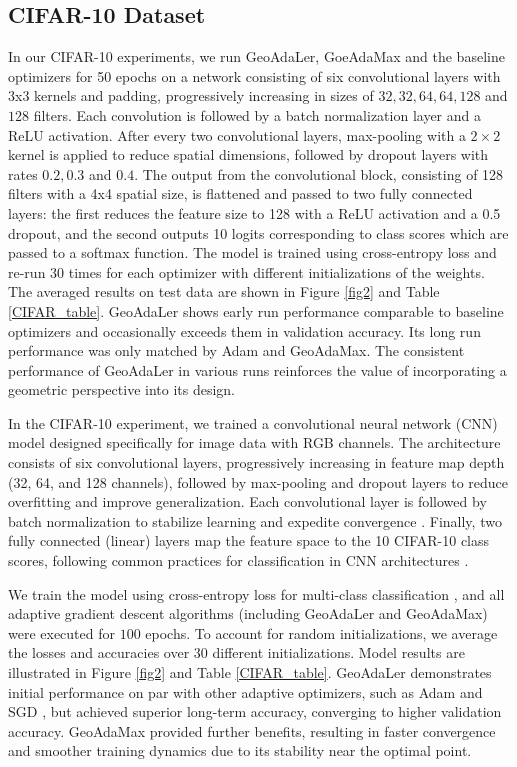 \documentclass{article}
\begin{document}
\subsection{CIFAR-10 Dataset}

In our CIFAR-10 \citep{Krizhevsky2012} experiments, we run GeoAdaLer, GoeAdaMax and the baseline optimizers for 50 epochs on a network consisting of six convolutional layers with 3x3 kernels and padding, progressively increasing in sizes of $32,32,64,64,128$ and $128$ filters. Each convolution is followed by a batch normalization layer and a ReLU activation. After every two convolutional layers, max-pooling with a $2\times2$ kernel is applied to reduce spatial dimensions, followed by dropout layers with rates $0.2,0.3$ and $0.4$. The output from the convolutional block, consisting of 128 filters with a 4x4 spatial size, is flattened and passed to two fully connected layers: the first reduces the feature size to 128 with a ReLU activation and a 0.5 dropout, and the second outputs 10 logits corresponding to class scores which are passed to a softmax function. The model is trained using cross-entropy loss and re-run 30 times for each optimizer with different initializations of the weights. The averaged results on test data are shown in Figure \ref{fig2} and Table \ref{CIFAR_table}. 
GeoAdaLer shows early run performance comparable to baseline optimizers and occasionally exceeds them in validation accuracy.
Its long run performance was only matched by Adam and GeoAdaMax. The consistent performance of GeoAdaLer in various runs reinforces the value of incorporating a geometric perspective into its design. 

In the CIFAR-10 \citep{Krizhevsky2012} experiment, we trained a convolutional neural network (CNN) model designed specifically for image data with RGB channels. The architecture consists of six convolutional layers, progressively increasing in feature map depth (32, 64, and 128 channels), followed by max-pooling and dropout layers to reduce overfitting and improve generalization. Each convolutional layer is followed by batch normalization to stabilize learning and expedite convergence \citep{ioffe2015batch}. Finally, two fully connected (linear) layers map the feature space to the 10 CIFAR-10 class scores, following common practices for classification in CNN architectures \citep{krizhevsky2012imagenet}.

We train the model using cross-entropy loss for multi-class classification \citep{goodfellow2016deep}, and all adaptive gradient descent algorithms (including GeoAdaLer and GeoAdaMax) were executed for $100$ epochs. To account for random initializations, we average the losses and accuracies over $30$ different initializations. Model results are illustrated in Figure \ref{fig2} and Table \ref{CIFAR_table}. GeoAdaLer demonstrates initial performance on par with other adaptive optimizers, such as Adam \citep{kingma2014adam} and SGD \citep{lecun1998gradient}, but achieved superior long-term accuracy, converging to higher validation accuracy. GeoAdaMax provided further benefits, resulting in faster convergence and smoother training dynamics due to its stability near the optimal point.
\end{document}
